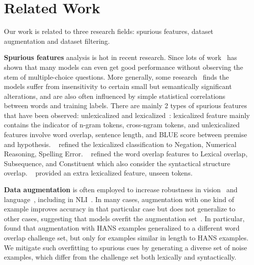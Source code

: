 \section{Related Work}
\label{sec:related}

Our work is related to three research fields: spurious features, dataset augmentation and dataset filtering.
 
\textbf{Spurious features} analysis is hot in recent research. Since 
lots of work~\cite{sharma2018tackling,srinivasan2018simple,zellers2018swag} 
has shown that many models can even 
get good performance without observing the stem of  multiple-choice questions.
More generally, some research~\cite{sanchez2018behavior} finds the models suffer
from insensitivity to certain small but semantically significant alterations, and are also
often influenced by simple statistical correlations between words and training labels. 
There are mainly 2 types of spurious features that have been observed: 
 unlexicalized and  lexicalized~\cite{bowman2015large}:
lexicalized feature mainly contains the indicator of n-gram tokens, cross-ngram tokens, 
and unlexicalized features involve word overlap, sentence length, and BLUE score between 
premise and hypothesis. ~\cite{naik2018stress} refined the lexicalized classification to Negation, Numerical Reasoning, 
Spelling Error. ~\cite{mccoy2019right} refined the word overlap 
features to Lexical overlap, Subsequence, and Constituent 
which also consider the syntactical structure overlap. ~\cite{sanchez2018behavior} 
provided an extra lexicalized feature, unseen tokens. 

\textbf{Data augmentation}
 is often employed to increase
robustness in vision~\cite{perez2017effectiveness} and
language~\cite{belinkov2017synthetic}, 
including in NLI~\cite{minervini2018adversarially,yanaka2019help}. 
In many cases, augmentation with one kind of example improves accuracy
in that particular case but does not generalize to
other cases, suggesting that models overfit the
augmentation set~\cite{jia2017adversarial,ribeiro2018semantically,iyyer2018adversarial,liu2019inoculation}. 
In particular, \cite{mccoy2019right} found that augmentation with HANS examples generalized to
a different word overlap challenge set, but only for examples similar in length
to HANS examples. We mitigate such overfitting to
spurious cues by generating a diverse set of
noise examples, which differ from the challenge set both lexically and syntactically. 

